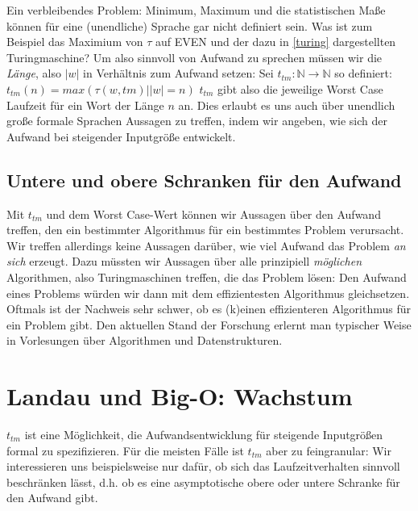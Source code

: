 Ein verbleibendes Problem: Minimum, Maximum und die statistischen Maße 
können für eine (unendliche) Sprache gar nicht definiert sein.
Was ist zum Beispiel das Maximium von $\tau$ auf EVEN und der
dazu in \autoref{turing} dargestellten Turingmaschine?
Um also sinnvoll von Aufwand zu sprechen müssen wir die \emph{Länge},
also $|w|$ in Verhältnis zum Aufwand setzen:
Sei $t_{tm}: \mathbb{N} \rightarrow \mathbb{N}$ so definiert:
$t_{tm}(n) = max({\tau(w, tm)| |w| = n})$
$t_{tm}$ gibt also die jeweilige Worst Case Laufzeit für ein Wort der Länge $n$ an.
Dies erlaubt es uns auch über unendlich große formale Sprachen Aussagen zu treffen,
indem wir angeben, wie sich der Aufwand bei steigender Inputgröße entwickelt.

\subsection{Untere und obere Schranken für den Aufwand}
Mit $t_{tm}$ und dem Worst Case-Wert können wir Aussagen über den Aufwand treffen,
den ein bestimmter Algorithmus für ein bestimmtes Problem verursacht.
Wir treffen allerdings keine Aussagen darüber,
wie viel Aufwand das Problem \emph{an sich} erzeugt.
Dazu müssten wir Aussagen über alle prinzipiell \emph{möglichen} Algorithmen,
also Turingmaschinen treffen,
die das Problem lösen:
Den Aufwand eines Problems würden wir dann mit dem effizientesten Algorithmus gleichsetzen.
Oftmals ist der Nachweis sehr schwer,
ob es (k)einen effizienteren Algorithmus
für ein Problem gibt.
Den aktuellen Stand der Forschung erlernt man typischer Weise in Vorlesungen über
Algorithmen und Datenstrukturen.


\section{Landau und Big-O: Wachstum}

$t_{tm}$ ist eine Möglichkeit,
die Aufwandsentwicklung für steigende Inputgrößen formal zu spezifizieren.
Für die meisten Fälle ist $t_{tm}$ aber zu feingranular:
Wir interessieren uns beispielsweise nur dafür,
ob sich das Laufzeitverhalten sinnvoll beschränken lässt,
d.h. ob es eine asymptotische obere oder untere Schranke für den Aufwand gibt.

